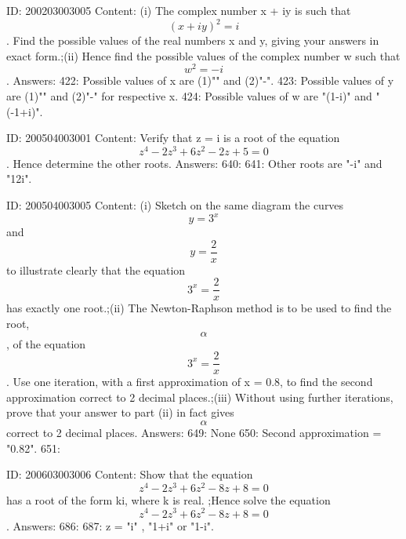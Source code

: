 \documentclass{article}
\begin{document}
ID: 200203003005
Content:
(i) The complex number x + iy is such that  $$( x + iy )^2  = i$$. Find the possible values of the real numbers x and y, giving your answers in exact form.;(ii) Hence find the possible values of the complex number w such that  $$w^2  =  - i$$. Answers:
422: Possible values of x are (1)"" and (2)"-".
423: Possible values of y are (1)"" and (2)"-" for respective x.
424: Possible values of w are "(1-i)" and " (-1+i)".

ID: 200504003001
Content:
Verify that z = i is a root of the equation  $$z^4  - 2z^3  + 6z^2  - 2z + 5 = 0$$. Hence determine the other roots.  Answers:
640: 
641: Other roots are "-i" and "1\pm2i".

ID: 200504003005
Content:
(i) Sketch on the same diagram the curves  $$y = 3^x $$ and  $$y = \frac{2}{x}$$ to illustrate clearly that the equation  $$3^x  = \frac{2}{x}$$ has exactly one root.;(ii) The Newton-Raphson method is to be used to find the root,  $$\alpha $$, of the equation  $$3^x  = \frac{2}{x}$$. Use one iteration, with a first approximation of x = 0.8, to find the second approximation correct to 2 decimal places.;(iii) Without using further iterations, prove that your answer to part (ii) in fact gives  $$\alpha $$ correct to 2 decimal places. Answers:
649: None
650: Second approximation = "0.82".
651: 

ID: 200603003006
Content:
Show that the equation $$z^{4}-2z^{3}+6z^{2}-8z+8=0$$ has a root of the form ki, where k is real. ;Hence solve the equation $$z^{4}-2z^{3}+6z^{2}-8z+8=0$$. Answers:
686: 
687: z = \pm"i" , "1+i" or "1-i".
\end{document}
